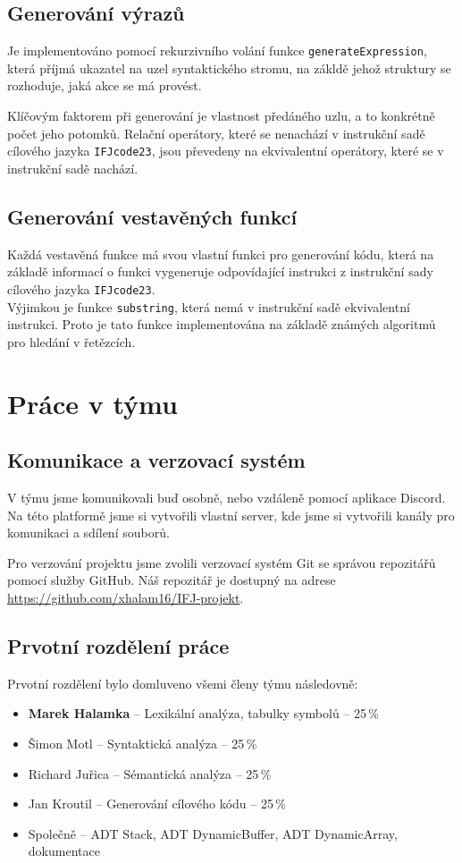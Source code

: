 \documentclass[a4paper, 11pt]{article}
\begin{document}
	\subsection{Generování výrazů}
	\label{sec:gen_expr}
	Je implementováno pomocí rekurzivního volání funkce \texttt{generateExpression}, která příjmá ukazatel na uzel syntaktického stromu, na zákldě jehož struktury se rozhoduje, jaká akce se má provést.
	\par\noindent Klíčovým faktorem při generování je vlastnost předáného uzlu, a to konkrétně počet jeho potomků. Relační operátory, které se nenachází v instrukční sadě cílového jazyka \texttt{IFJcode23}, jsou převedeny na ekvivalentní operátory, které se v instrukční sadě nachází.
	\subsection{Generování vestavěných funkcí}
	\label{sec:gen_builtin}
	Každá vestavěná funkce má svou vlastní funkci pro generování kódu, která na základě informací o funkci vygeneruje odpovídající instrukci z instrukční sady cílového jazyka \texttt{IFJcode23}. \\Výjimkou je funkce \texttt{substring}, která nemá v instrukční sadě ekvivalentní instrukci. Proto je tato funkce implementována na základě známých algoritmů pro hledání v řetězcích.

	\newpage
	\section{Práce v týmu}

	\subsection{Komunikace a verzovací systém}
	V týmu jsme komunikovali buď osobně, nebo vzdáleně pomocí aplikace Discord. Na této platformě jsme si vytvořili vlastní server, kde jsme si vytvořili kanály pro komunikaci a sdílení souborů. 
	\par\noindent Pro verzování projektu jsme zvolili verzovací systém Git se správou repozitářů pomocí služby GitHub. Náš repozitář je dostupný na adrese \url{https://github.com/xhalam16/IFJ-projekt}.


	\subsection{Prvotní rozdělení práce}
	Prvotní rozdělení bylo domluveno všemi členy týmu následovně:
	\begin{itemize}
		\item \textbf{Marek Halamka} -- Lexikální analýza, tabulky symbolů  -- 25\,\%
		\item Šimon Motl -- Syntaktická analýza -- 25\,\%
		\item Richard Juřica -- Sémantická analýza -- 25\,\%
		\item Jan Kroutil -- Generování cílového kódu -- 25\,\% 
		\item Společně -- ADT Stack, ADT DynamicBuffer, ADT DynamicArray, dokumentace
	\end{itemize}
\end{document}
